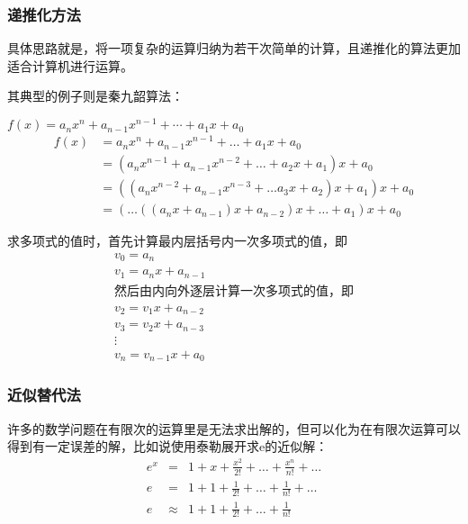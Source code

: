 \documentclass[12pt]{article}
\numberwithin{equation}{section}
\begin{document}
	\subsubsection{递推化方法}
	具体思路就是，将一项复杂的运算归纳为若干次简单的计算，且递推化的算法更加适合计算机进行运算。
	
	其典型的例子则是秦九韶算法：

	$f(x)=a_{n} x^{n}+a_{n-1} x^{n-1}+\cdots+a_{1} x+a_{0}$ 
	\begin{equation}
		\begin{aligned}
			f(x)&=a_{n} x^{n}+a_{n-1} x^{n-1}+\ldots+a_{1} x+a_{0} \\
				&=\left(a_{n} x^{n-1}+a_{n-1} x^{n-2}+\ldots+a_{2} x+a_{1}\right) x+a_{0} \\
				&=\left(\left(a_{n} x^{n-2}+a_{n-1} x^{n-3}+\ldots a_{3} x+a_{2}\right) x+a_{1}\right) x+a_{0} \\
				&=\left(\ldots\left(\left(a_{n} x+a_{n-1}\right) x+a_{n-2}\right) x+\ldots+a_{1}\right) x+a_{0}
		\end{aligned}
	\end{equation}

	求多项式的值时，首先计算最内层括号内一次多项式的值，即
	$$
	\begin{array}{l}
		v_{0}=a_{n} \\
		v_{1}=a_{n} x+a_{n-1} \\
		\text{然后由内向外逐层计算一次多项式的值，即} \\
		v_{2}=v_{1} x+a_{n-2} \\
		v_{3}=v_{2} x+a_{n-3} \\
		\vdots	\\
		v_{n}=v_{n-1} x+a_{0}
	\end{array}
	$$

	
	\subsubsection{近似替代法}
	许多的数学问题在有限次的运算里是无法求出解的，但可以化为在有限次运算可以得到有一定误差的解，比如说使用泰勒展开求e的近似解：  
	\begin{equation}
		\begin{aligned}
			e^x &=& 1 + x + \frac{x^2}{2!} + \ldots + \frac{x^n}{n!} + \ldots \\
			e &=& 1 + 1 + \frac{1}{2!} + \ldots + \frac{1}{n!} + \ldots \\
			e &\approx& 1 + 1 + \frac{1}{2!} + \ldots + \frac{1}{n!}
		\end{aligned}
	\end{equation}
\end{document}
